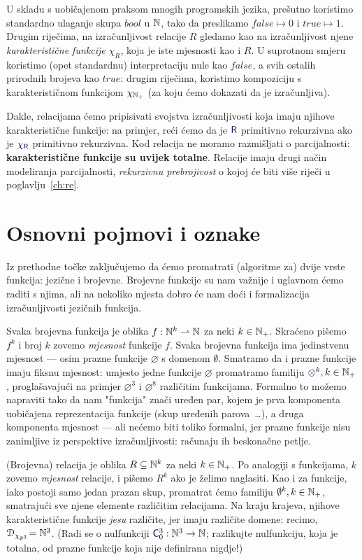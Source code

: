 U skladu s uobičajenom praksom mnogih programskih jezika, prešutno koristimo standardno ulaganje skupa $bool$ u ${\mathbb N}$, tako da preslikamo $\mathit{false}\mapsto 0$ i $\mathit{true}\mapsto 1$. Drugim riječima, na izračunljivost relacije $R$ gledamo kao na izračunljivost njene \emph{karakteristične funkcije} $\chi_R$, koja je iste mjesnosti kao i $R$. U suprotnom smjeru koristimo (opet standardnu) interpretaciju nule kao $\mathit{false}$, a svih ostalih prirodnih brojeva kao $\mathit{true}$: drugim riječima, koristimo kompoziciju s karakterističnom funkcijom $\chi_{{\mathbb N}_+}$ (za koju ćemo dokazati da je izračunljiva).

Dakle, relacijama ćemo pripisivati svojstva izračunljivosti koja imaju njihove karakteristične funkcije: na primjer, reći ćemo da je $\f{R}$ primitivno rekurzivna ako je $\chi_{\f{R}}$ primitivno rekurzivna. Kod relacija ne moramo razmišljati o parcijalnosti: \textbf{karakteristične funkcije su uvijek totalne}. Relacije imaju drugi način modeliranja parcijalnosti, \emph{rekurzivnu prebrojivost} o kojoj će biti više riječi u poglavlju~\ref{ch:re}.

\section{Osnovni pojmovi i oznake}

Iz prethodne točke zaključujemo da ćemo promatrati (algoritme za) dvije vrste funkcija: jezične i brojevne. Brojevne funkcije su nam važnije i uglavnom ćemo raditi s njima, ali na nekoliko mjesta dobro će nam doći i formalizacija izračunljivosti jezičnih funkcija.

Svaka brojevna funkcija je oblika $f:{\mathbb N}^k\rightharpoonup{\mathbb N}$ za neki $k\in{\mathbb N}_+$. Skraćeno pišemo $f^k$ i broj $k$ zovemo \emph{mjesnost} funkcije $f$. Svaka brojevna funkcija ima jedinstvenu mjesnost --- osim prazne funkcije $\varnothing$ s domenom $\emptyset$. Smatramo da i prazne funkcije imaju fiksnu mjesnost: umjesto jedne funkcije $\varnothing$ promatramo familiju $\varnothing^k,k\in\N_+$, proglašavajući na primjer $\varnothing^3$ i $\varnothing^8$ različitim funkcijama. Formalno to možemo napraviti tako da nam "funkcija" znači uređen par, kojem je prva komponenta uobičajena reprezentacija funkcije (skup uređenih parova~\ldots), a druga komponenta mjesnost --- ali nećemo biti toliko formalni, jer prazne funkcije nisu zanimljive iz perspektive izračunljivosti: računaju ih beskonačne petlje.

(Brojevna) relacija je oblika $R\subseteq{\mathbb N}^k$ za neki $k\in{\mathbb N}_+$. Po analogiji s funkcijama, $k$ zovemo \emph{mjesnost} relacije, i pišemo $R^k$ ako je želimo naglasiti. Kao i za funkcije, iako postoji samo jedan prazan skup, promatrat ćemo familiju $\emptyset^k,k\in{\mathbb N}_+$, smatrajući sve njene elemente različitim relacijama. Na kraju krajeva, njihove karakteristične funkcije \emph{jesu} različite, jer imaju različite domene: recimo, $\mathcal D_{\chi_{\emptyset^3}}\!={\mathbb N}^3$. (Radi se o nulfunkciji $\f C_0^3:\N^3\to\N$; razlikujte nulfunkciju, koja je totalna, od prazne funkcije koja nije definirana nigdje!)


